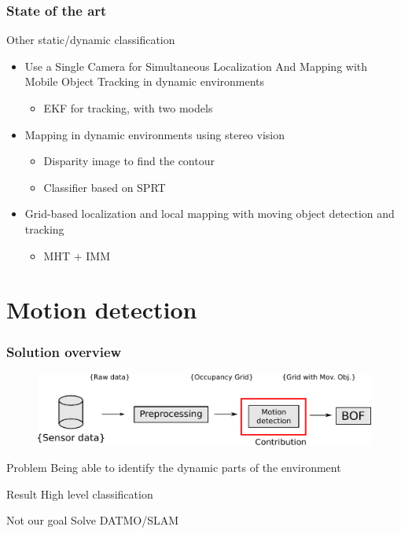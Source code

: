 \documentclass{beamer}
\begin{document}
	\begin{frame}
		\frametitle{State of the art}
		
		\begin{block}{Other static/dynamic classification}
			\begin{itemize}
			\item Use a Single Camera for Simultaneous Localization And Mapping with  Mobile Object Tracking in dynamic environments \cite{Migliore_2009_ICRA}
				\begin{itemize}			
				\item EKF for tracking, with two models				
				\end{itemize}		
			\item Mapping in dynamic environments using stereo vision \cite{DBLP:conf/ivs/LategahnGHKE11}
				\begin{itemize}
				\item Disparity image to find the contour
				\item Classifier based on SPRT				
				\end{itemize}		
			\item Grid-based localization and local mapping with moving object detection and tracking \cite{Vu201158}
				\begin{itemize}			
				\item MHT + IMM			
				\end{itemize}	
			\end{itemize}		
		\end{block}
	\end{frame}


\section{Motion detection}

	\begin{frame}
		\frametitle{Solution overview}
		\begin{figure}[h]
			\center
			\includegraphics[scale=0.6]{img/fig:motion:overview:01}
		 \end{figure}
		\begin{block}{Problem}
			 Being able to identify the dynamic parts of the environment
		\end{block}
		 
		\begin{block}{Result}
			High level classification
		\end{block}				 

		\begin{alertblock}{Not our goal}
			Solve DATMO/SLAM
		\end{alertblock}
	\end{frame}
\end{document}

